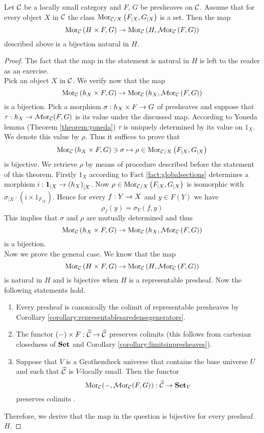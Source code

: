 \begin{theorem}\label{theorem:internalhomforpresheaves}
Let ${\mathcal C}$ be a locally small category and $F$, $G$ be presheaves on ${\mathcal C}$. Assume that for every object $X$ in ${\mathcal C}$ the class $\mathrm{Mor}_{{\mathcal C}/X}\left(F_{\mid X},G_{\mid X}\right)$ is a set. Then the map 
$$\mathrm{Mor}_{{\mathcal C}}\left(H\times F,G\right)\rightarrow  \mathrm{Mor}_{{\mathcal C}}\left(H,\mathcal{M}\mathrm{or}_{{\mathcal C}}\left(F,G\right)\right)$$
described above is a bijection natural in $H$. 
\end{theorem}
\begin{proof}
The fact that the map in the statement is natural in $H$ is left to the reader as an exercise.\\
Pick an object $X$ in ${\mathcal C}$. We verify now that the map
$$\mathrm{Mor}_{{\mathcal C}}\left(h_X\times F,G\right)\rightarrow  \mathrm{Mor}_{{\mathcal C}}\left(h_X,\mathcal{M}\mathrm{or}_{{\mathcal C}}\left(F,G\right)\right)$$
is a bijection. Pick a morphism $\sigma:h_X\times F\rightarrow G$ of presheaves and suppose that $\tau:h_X\rightarrow \mathcal{M}\mathrm{or}_{{\mathcal C}}(F,G)$ is its value under the discussed map. According to Yoneda lemma (Theorem \ref{theorem:yoneda}) $\tau$ is uniquely determined by its value on $1_X$. We denote this value by $\rho$. Thus it suffices to prove that 
$$\mathrm{Mor}_{{\mathcal C}}\left(h_X\times F,G\right)\ni \sigma \mapsto \rho \in \mathrm{Mor}_{{\mathcal C}/X}\left(F_{\mid X},G_{\mid X}\right)$$
is bijective. We retrieve $\rho$ by means of procedure described before the statement of this theorem. Firstly $1_X$ according to Fact \ref{fact:globalsections} determines a morphism $i:\mathbf{1}_{\mid X}\rightarrow \left(h_X\right)_{\mid X}$. Now $\rho\in \mathrm{Mor}_{{\mathcal C}/X}\left(F_{\mid X},G_{\mid X}\right)$ is isomorphic with $\sigma_{\mid X}\cdot \left(i\times 1_{F_{\mid X}}\right)$. Hence for every $f:Y\rightarrow X$ and $y\in F(Y)$ we have 
$$\rho_f(y) = \sigma_Y(f,y)$$
This implies that $\sigma$ and $\rho$ are mutually determined and thus
$$\mathrm{Mor}_{{\mathcal C}}\left(h_X\times F,G\right)\rightarrow  \mathrm{Mor}_{{\mathcal C}}\left(h_X,\mathcal{M}\mathrm{or}_{{\mathcal C}}\left(F,G\right)\right)$$
is a bijection.\\
Now we prove the general case. We know that the map
$$\mathrm{Mor}_{{\mathcal C}}\left(H\times F,G\right)\rightarrow  \mathrm{Mor}_{{\mathcal C}}\left(H,\mathcal{M}\mathrm{or}_{{\mathcal C}}\left(F,G\right)\right)$$
is natural in $H$ and is bijective when $H$ is a representable presheaf. Now the following statements hold.
\begin{enumerate}[label=\textbf{(\arabic*)}, leftmargin=1.5em]
\item Every presheaf is canonically the colimit of representable presheaves by Corollary \ref{corollary:representablesaredensegenerators}.
\item The functor $(-)\times F:\widehat{{\mathcal C}}\rightarrow \widehat{{\mathcal C}}$ preserves colimits (this follows from cartesian closedness of $\mathbf{Set}$ {\cite[page 98]{Maclane}} and Corollary \ref{corollary:limitsinpresheaves}).
\item Suppose that $V$ is a Grothendieck universe that contains the base universe $U$ and such that $\widehat{{\mathcal C}}$ is $V$-locally small. Then the functor
$$\mathrm{Mor}_{{\mathcal C}}(-,\mathcal{M}\mathrm{or}_{{\mathcal C}}(F,G)):\widehat{{\mathcal C}}\rightarrow \mathbf{Set}_V$$
preserves colimits {\cite[V.4, Theorem 1]{Maclane}}.
\end{enumerate}
Therefore, we derive that the map in the question is bijective for every presheaf $H$.
\end{proof}

